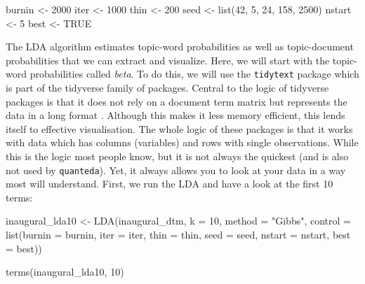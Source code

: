 \documentclass[
]{article}
\newenvironment{Shaded}{\begin{snugshade}}{\end{snugshade}}
\newcommand{\AttributeTok}[1]{\textcolor[rgb]{0.77,0.63,0.00}{#1}}
\newcommand{\ConstantTok}[1]{\textcolor[rgb]{0.00,0.00,0.00}{#1}}
\newcommand{\DecValTok}[1]{\textcolor[rgb]{0.00,0.00,0.81}{#1}}
\newcommand{\FunctionTok}[1]{\textcolor[rgb]{0.00,0.00,0.00}{#1}}
\newcommand{\NormalTok}[1]{#1}
\newcommand{\OtherTok}[1]{\textcolor[rgb]{0.56,0.35,0.01}{#1}}
\newcommand{\StringTok}[1]{\textcolor[rgb]{0.31,0.60,0.02}{#1}}
\begin{document}
\begin{Shaded}
\begin{Highlighting}[]
\NormalTok{burnin }\OtherTok{\textless{}{-}} \DecValTok{2000}
\NormalTok{iter }\OtherTok{\textless{}{-}} \DecValTok{1000}
\NormalTok{thin }\OtherTok{\textless{}{-}} \DecValTok{200}
\NormalTok{seed }\OtherTok{\textless{}{-}} \FunctionTok{list}\NormalTok{(}\DecValTok{42}\NormalTok{, }\DecValTok{5}\NormalTok{, }\DecValTok{24}\NormalTok{, }\DecValTok{158}\NormalTok{, }\DecValTok{2500}\NormalTok{)}
\NormalTok{nstart }\OtherTok{\textless{}{-}} \DecValTok{5}
\NormalTok{best }\OtherTok{\textless{}{-}} \ConstantTok{TRUE}
\end{Highlighting}
\end{Shaded}

The LDA algorithm estimates topic-word probabilities as well as topic-document probabilities that we can extract and visualize. Here, we will start with the topic-word probabilities called \emph{beta}. To do this, we will use the \texttt{tidytext} package which is part of the tidyverse family of packages. Central to the logic of tidyverse packages is that it does not rely on a document term matrix but represents the data in a long format \autocite[p.252]{Welbers2017a}. Although this makes it less memory efficient, this lends itself to effective visualisation. The whole logic of these packages is that it works with data which has columns (variables) and rows with single observations. While this is the logic most people know, but it is not always the quickest (and is also not used by \texttt{quanteda}). Yet, it always allows you to look at your data in a way most will understand. First, we run the LDA and have a look at the first 10 terms:

\begin{Shaded}
\begin{Highlighting}[]
\NormalTok{inaugural\_lda10 }\OtherTok{\textless{}{-}} \FunctionTok{LDA}\NormalTok{(inaugural\_dtm, }\AttributeTok{k =} \DecValTok{10}\NormalTok{, }\AttributeTok{method =} \StringTok{"Gibbs"}\NormalTok{,}
    \AttributeTok{control =} \FunctionTok{list}\NormalTok{(}\AttributeTok{burnin =}\NormalTok{ burnin, }\AttributeTok{iter =}\NormalTok{ iter, }\AttributeTok{thin =}\NormalTok{ thin,}
        \AttributeTok{seed =}\NormalTok{ seed, }\AttributeTok{nstart =}\NormalTok{ nstart, }\AttributeTok{best =}\NormalTok{ best))}

\FunctionTok{terms}\NormalTok{(inaugural\_lda10, }\DecValTok{10}\NormalTok{)}
\end{Highlighting}
\end{Shaded}
\end{document}
